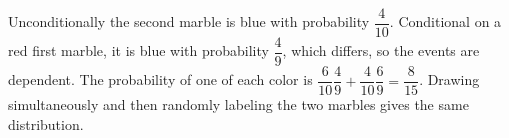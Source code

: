 Unconditionally the second marble is blue with probability $\dfrac{4}{10}$. Conditional on a red first marble, it is blue with probability $\dfrac{4}{9}$, which differs, so the events are dependent. The probability of one of each color is $\dfrac{6}{10}\dfrac{4}{9}+\dfrac{4}{10}\dfrac{6}{9}=\boxed{\dfrac{8}{15}}$. Drawing simultaneously and then randomly labeling the two marbles gives the same distribution.
